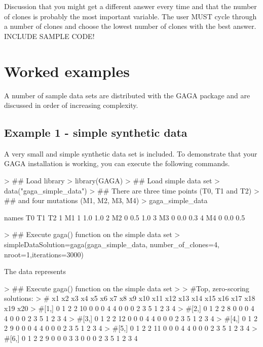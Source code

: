 \documentclass{article}
\begin{document}
Discussion that you might get a different answer every time and that the number of clones is probably the most important variable.  The user MUST cycle through a number of clones and choose the lowest number of clones with the best answer.  INCLUDE SAMPLE CODE!


\section{Worked examples}
A number of sample data sets are distributed with the GAGA package and are discussed in order of increasing complexity.
\subsection{Example 1 - simple synthetic data}
A very small and simple synthetic data set is included.  To demonstrate that your GAGA installation is working, you can execute the following commands.  
\begin{Schunk}
\begin{Sinput}
> ## Load library
> library(GAGA)
> ## Load simple data set
> data("gaga_simple_data")
> ## There  are three time points (T0, T1 and T2)
> ## and four mutations (M1, M2, M3, M4)
> gaga_simple_data
\end{Sinput}
\begin{Soutput}
  names T0  T1  T2
1    M1  1 1.0 1.0
2    M2  0 0.5 1.0
3    M3  0 0.0 0.3
4    M4  0 0.0 0.5
\end{Soutput}
\end{Schunk}

\begin{Schunk}
\begin{Sinput}
> ## Execute gaga() function on the simple data set
> simpleDataSolution=gaga(gaga_simple_data, number_of_clones=4, nroot=1,iterations=3000)
\end{Sinput}
\end{Schunk}

The data represents 

\begin{Schunk}
\begin{Sinput}
> ## Execute gaga() function on the simple data set
> 
> #Top, zero-scoring solutions:
> #     x1 x2 x3 x4 x5 x6 x7 x8 x9 x10 x11 x12 x13 x14 x15 x16 x17 x18 x19 x20
> #[1,]  0  1  2  2 10  0  0  0  4   4   0   0   0   2   3   5   1   2   3   4
> #[2,]  0  1  2  2  8  0  0  0  4   4   0   0   0   2   3   5   1   2   3   4
> #[3,]  0  1  2  2 12  0  0  0  4   4   0   0   0   2   3   5   1   2   3   4
> #[4,]  0  1  2  2  9  0  0  0  4   4   0   0   0   2   3   5   1   2   3   4
> #[5,]  0  1  2  2 11  0  0  0  4   4   0   0   0   2   3   5   1   2   3   4
> #[6,]  0  1  2  2  9  0  0  0  3   3   0   0   0   2   3   5   1   2   3   4
\end{Sinput}
\end{Schunk}
\end{document}
